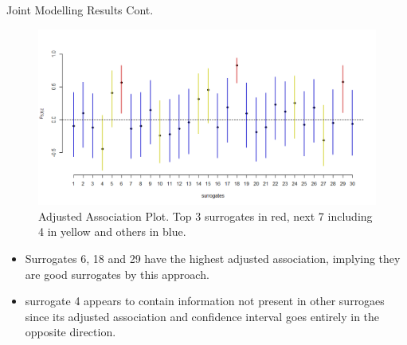 \documentclass[a4paper,9pt]{beamer}\usepackage[]{graphicx}\usepackage[]{color}
\begin{document}
\begin{frame}{Joint Modelling Results Cont.}

\begin{figure}[H]
\includegraphics[scale=0.5]{adjustedassociationplot.png}
\caption{ \tiny Adjusted Association Plot. Top 3 surrogates in red, next 7 including 4 in yellow and others in blue.}
\end{figure}

\tiny
\begin{itemize}
\item Surrogates 6, 18 and 29 have the highest adjusted association, implying they are good surrogates by this approach.
\item surrogate 4 appears to contain information not present in other surrogaes since its adjusted association and confidence interval goes entirely in the opposite direction. 
\end{itemize}

\end{frame}
\end{document}
